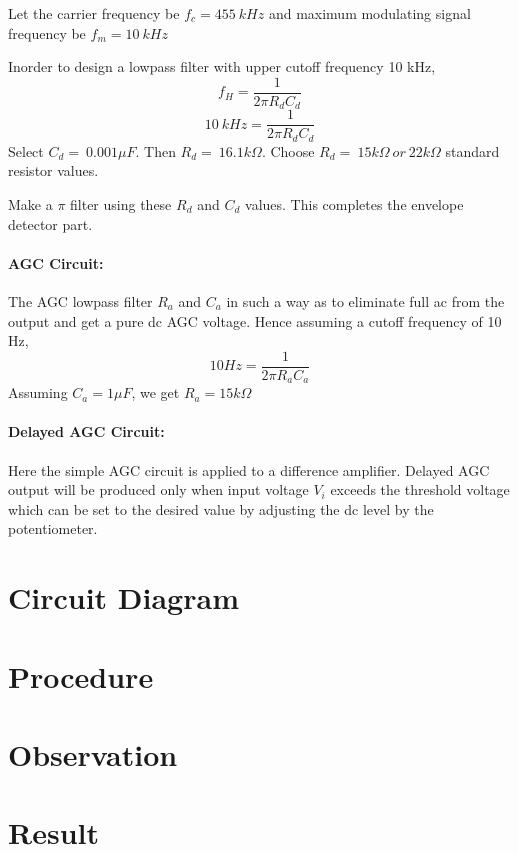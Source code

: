 Let the carrier frequency be $f_c=455\ kHz$ and maximum modulating signal frequency be $f_m=10\ kHz$

\noindent Inorder to design a lowpass filter with upper cutoff frequency 10 kHz,
\begin{equation}
f_H=\frac{1}{2\pi R_dC_d}
\end{equation}
\begin{equation}
10\ kHz=\frac{1}{2\pi R_dC_d}
\end{equation}
\noindent Select $C_d=\ 0.001 \mu F$. Then $R_d=\ 16.1k\Omega$.
Choose $R_d=\ 15k\Omega \ or\ 22k\Omega$ standard resistor values.

Make a $\pi$ filter using these $R_d$ and $C_d$ values. This completes the envelope detector part.
\paragraph{AGC Circuit:} The AGC lowpass filter $R_a$ and $C_a$ in such a way as to eliminate full ac from the output and get a pure dc AGC voltage. 
Hence assuming a cutoff frequency of 10 Hz,
\begin{equation}
10 Hz= \frac{1}{2\pi R_aC_a}
\end{equation}
\noindent Assuming $C_a=1 \mu F$, we get $R_a=15 k \Omega$
\paragraph{Delayed AGC Circuit:}
Here the simple AGC circuit is applied to a difference amplifier.  Delayed AGC output will be produced only when input voltage $V_i$ exceeds the threshold voltage which can be set to the desired value by adjusting the dc level by the potentiometer.

\section*{Circuit Diagram}
\section*{Procedure}
\section*{Observation}
\section*{Result}
